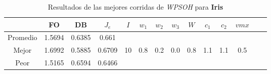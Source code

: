 \begin{table}[h!]
\footnotesize
\begin{center}
\begin{tabular}{|c|c|c|c|c|c|c|c|c|c|c|c|c|c|}
\hline
& {\bf FO} & {\bf DB}& $J_e$ & $I$ & $w_1$ & $w_2$ & $w_3$ & $W$ & $c_1$ & $c_2$ & $vmx$ \\
\hline
\hline
Promedio   & 1.5694 & 0.6385  & 0.661 &  &  &  &  &  &  &  & \\
\cline{1-4}
Mejor & 1.6992 & 0.5885  & 0.6709 & 10 & 0.8 & 0.2 & 0.0 & 0.8 & 1.1 & 1.1 & 0.5\\
\cline{1-4}
Peor & 1.5165 & 0.6594  & 0.6466 &  &  &  &  &  &  &  & \\\hline
\end{tabular}
\caption{Resultados de las mejores corridas de \emph{WPSOH} para {\bf Iris}}
\label{tb:pmpwpsohibcsv}
\end{center}
\end{table}

